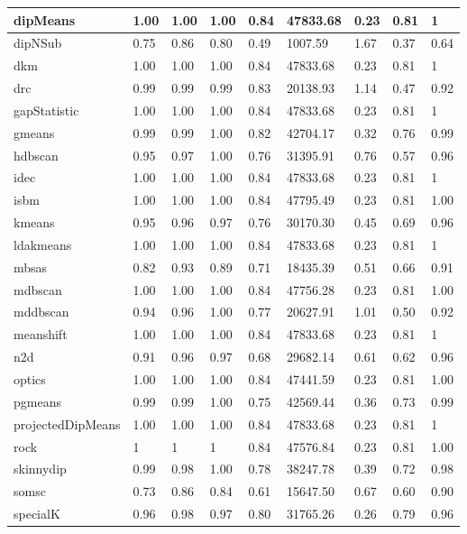 \begin{table}[H]
\begin{tabular}{|l|l|l|l|l|l|l|l|l|}
\hline
dipMeans & 1.00 & 1.00 & 1.00 & 0.84 & 47833.68 & 0.23 & 0.81 & 1 \\
\hline
dipNSub & 0.75 & 0.86 & 0.80 & 0.49 & 1007.59 & 1.67 & 0.37 & 0.64 \\
\hline
dkm & 1.00 & 1.00 & 1.00 & 0.84 & 47833.68 & 0.23 & 0.81 & 1 \\
\hline
drc & 0.99 & 0.99 & 0.99 & 0.83 & 20138.93 & 1.14 & 0.47 & 0.92 \\
\hline
gapStatistic & 1.00 & 1.00 & 1.00 & 0.84 & 47833.68 & 0.23 & 0.81 & 1 \\
\hline
gmeans & 0.99 & 0.99 & 1.00 & 0.82 & 42704.17 & 0.32 & 0.76 & 0.99 \\
\hline
hdbscan & 0.95 & 0.97 & 1.00 & 0.76 & 31395.91 & 0.76 & 0.57 & 0.96 \\
\hline
idec & 1.00 & 1.00 & 1.00 & 0.84 & 47833.68 & 0.23 & 0.81 & 1 \\
\hline
isbm & 1.00 & 1.00 & 1.00 & 0.84 & 47795.49 & 0.23 & 0.81 & 1.00 \\
\hline
kmeans & 0.95 & 0.96 & 0.97 & 0.76 & 30170.30 & 0.45 & 0.69 & 0.96 \\
\hline
ldakmeans & 1.00 & 1.00 & 1.00 & 0.84 & 47833.68 & 0.23 & 0.81 & 1 \\
\hline
mbsas & 0.82 & 0.93 & 0.89 & 0.71 & 18435.39 & 0.51 & 0.66 & 0.91 \\
\hline
mdbscan & 1.00 & 1.00 & 1.00 & 0.84 & 47756.28 & 0.23 & 0.81 & 1.00 \\
\hline
mddbscan & 0.94 & 0.96 & 1.00 & 0.77 & 20627.91 & 1.01 & 0.50 & 0.92 \\
\hline
meanshift & 1.00 & 1.00 & 1.00 & 0.84 & 47833.68 & 0.23 & 0.81 & 1 \\
\hline
n2d & 0.91 & 0.96 & 0.97 & 0.68 & 29682.14 & 0.61 & 0.62 & 0.96 \\
\hline
optics & 1.00 & 1.00 & 1.00 & 0.84 & 47441.59 & 0.23 & 0.81 & 1.00 \\
\hline
pgmeans & 0.99 & 0.99 & 1.00 & 0.75 & 42569.44 & 0.36 & 0.73 & 0.99 \\
\hline
projectedDipMeans & 1.00 & 1.00 & 1.00 & 0.84 & 47833.68 & 0.23 & 0.81 & 1 \\
\hline
rock & 1 & 1 & 1 & 0.84 & 47576.84 & 0.23 & 0.81 & 1.00 \\
\hline
skinnydip & 0.99 & 0.98 & 1.00 & 0.78 & 38247.78 & 0.39 & 0.72 & 0.98 \\
\hline
somsc & 0.73 & 0.86 & 0.84 & 0.61 & 15647.50 & 0.67 & 0.60 & 0.90 \\
\hline
specialK & 0.96 & 0.98 & 0.97 & 0.80 & 31765.26 & 0.26 & 0.79 & 0.96 \\

\end{tabular}
\end{table}
